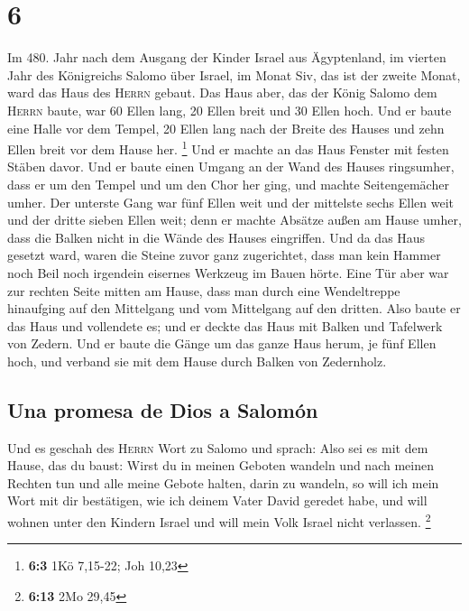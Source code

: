 \hypertarget{section-5}{%
\section{6}\label{section-5}}

 Im 480. Jahr nach dem Ausgang der Kinder Israel aus
Ägyptenland, im vierten Jahr des Königreichs Salomo über Israel, im
Monat Siv, das ist der zweite Monat, ward das Haus des \textsc{Herrn}
gebaut.  Das Haus aber, das der König Salomo dem
\textsc{Herrn} baute, war 60 Ellen lang, 20 Ellen breit und 30 Ellen
hoch.  Und er baute eine Halle vor dem Tempel, 20 Ellen
lang nach der Breite des Hauses und zehn Ellen breit vor dem Hause her.
\footnote{\textbf{6:3} 1Kö 7,15-22; Joh 10,23}  Und er
machte an das Haus Fenster mit festen Stäben davor.  Und
er baute einen Umgang an der Wand des Hauses ringsumher, dass er um den
Tempel und um den Chor her ging, und machte Seitengemächer umher.
 Der unterste Gang war fünf Ellen weit und der mittelste
sechs Ellen weit und der dritte sieben Ellen weit; denn er machte
Absätze außen am Hause umher, dass die Balken nicht in die Wände des
Hauses eingriffen.  Und da das Haus gesetzt ward, waren
die Steine zuvor ganz zugerichtet, dass man kein Hammer noch Beil noch
irgendein eisernes Werkzeug im Bauen hörte.  Eine Tür aber
war zur rechten Seite mitten am Hause, dass man durch eine Wendeltreppe
hinaufging auf den Mittelgang und vom Mittelgang auf den dritten.
 Also baute er das Haus und vollendete es; und er deckte
das Haus mit Balken und Tafelwerk von Zedern.  Und er
baute die Gänge um das ganze Haus herum, je fünf Ellen hoch, und verband
sie mit dem Hause durch Balken von Zedernholz.

\hypertarget{una-promesa-de-dios-a-salomuxf3n}{%
\subsection{Una promesa de Dios a
Salomón}\label{una-promesa-de-dios-a-salomuxf3n}}

 Und es geschah des \textsc{Herrn} Wort zu Salomo und
sprach:  Also sei es mit dem Hause, das du baust: Wirst
du in meinen Geboten wandeln und nach meinen Rechten tun und alle meine
Gebote halten, darin zu wandeln, so will ich mein Wort mit dir
bestätigen, wie ich deinem Vater David geredet habe,  und
will wohnen unter den Kindern Israel und will mein Volk Israel nicht
verlassen. \footnote{\textbf{6:13} 2Mo 29,45}

